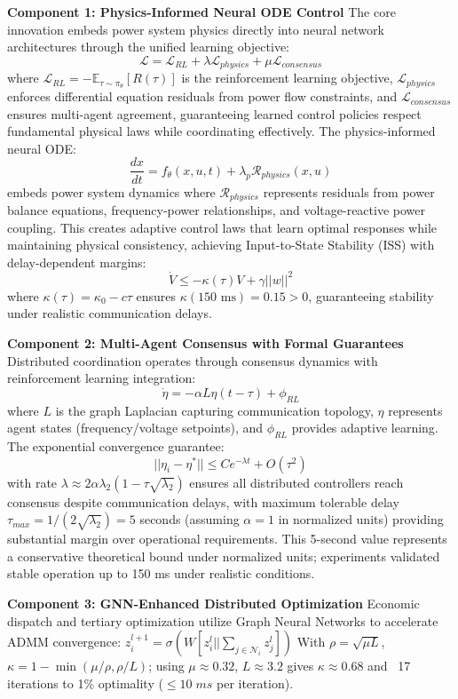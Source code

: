 \documentclass[12pt]{article}
\begin{document}
\textbf{Component 1: Physics-Informed Neural ODE Control}
The core innovation embeds power system physics directly into neural network architectures through the unified learning objective:
$$\mathcal{L} = \mathcal{L}_{RL} + \lambda \mathcal{L}_{physics} + \mu \mathcal{L}_{consensus}$$
where $\mathcal{L}_{RL} = -\mathbb{E}_{\tau \sim \pi_\theta}[R(\tau)]$ is the reinforcement learning objective, $\mathcal{L}_{physics}$ enforces differential equation residuals from power flow constraints, and $\mathcal{L}_{consensus}$ ensures multi-agent agreement, guaranteeing learned control policies respect fundamental physical laws while coordinating effectively. The physics-informed neural ODE:
$$\frac{dx}{dt} = f_\theta(x, u, t) + \lambda_p \mathcal{R}_{physics}(x, u)$$
embeds power system dynamics where $\mathcal{R}_{physics}$ represents residuals from power balance equations, frequency-power relationships, and voltage-reactive power coupling. This creates adaptive control laws that learn optimal responses while maintaining physical consistency, achieving Input-to-State Stability (ISS) with delay-dependent margins:
$$\dot{V} \leq -\kappa(\tau)V + \gamma||w||^2$$
where $\kappa(\tau) = \kappa_0 - c\tau$ ensures $\kappa(150\text{ ms}) = 0.15 > 0$, guaranteeing stability under realistic communication delays.

\textbf{Component 2: Multi-Agent Consensus with Formal Guarantees}
Distributed coordination operates through consensus dynamics with reinforcement learning integration:
$$\dot{\eta} = -\alpha L \eta(t-\tau) + \phi_{RL}$$
where $L$ is the graph Laplacian capturing communication topology, $\eta$ represents agent states (frequency/voltage setpoints), and $\phi_{RL}$ provides adaptive learning. The exponential convergence guarantee:
$$||\eta_i - \eta^*|| \leq Ce^{-\lambda t} + O(\tau^2)$$
with rate $\lambda \approx 2\alpha\lambda_2(1 - \tau\sqrt{\lambda_2})$ ensures all distributed controllers reach consensus despite communication delays, with maximum tolerable delay $\tau_{max} = 1/(2\sqrt{\lambda_2}) = 5$ seconds (assuming $\alpha = 1$ in normalized units) providing substantial margin over operational requirements. This 5-second value represents a conservative theoretical bound under normalized units; experiments validated stable operation up to 150 ms under realistic conditions.

\textbf{Component 3: GNN-Enhanced Distributed Optimization}
Economic dispatch and tertiary optimization utilize Graph Neural Networks to accelerate ADMM convergence:
$z_i^{l+1} = \sigma(W[z_i^l || \sum_{j \in \mathcal{N}_i} z_j^l])$
With $\rho = \sqrt{\mu L}$, $\kappa = 1 - \min(\mu/\rho, \rho/L)$; using $\mu \approx 0.32$, $L \approx 3.2$ gives $\kappa \approx 0.68$ and ~17 iterations to 1\% optimality ($\leq 10\;ms$ per iteration).
\end{document}
